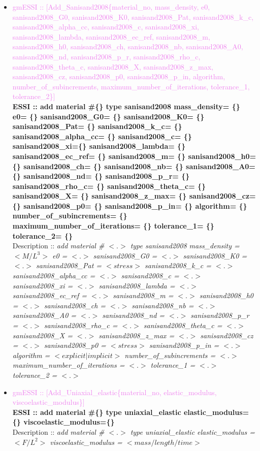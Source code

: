 \documentclass[11pt]{article}
\begin{document}
\begin{itemize}
      \item \textcolor{violet}{gmESSI :: [Add\_Sanisand2008\{material\_no, mass\_density, e0, sanisand2008\_G0, sanisand2008\_K0, sanisand2008\_Pat, sanisand2008\_k\_c, sanisand2008\_alpha\_cc, sanisand2008\_c, sanisand2008\_xi, sanisand2008\_lambda, sanisand2008\_ec\_ref, sanisand2008\_m, sanisand2008\_h0, sanisand2008\_ch, sanisand2008\_nb, sanisand2008\_A0, sanisand2008\_nd, sanisand2008\_p\_r, sanisand2008\_rho\_c, sanisand2008\_theta\_c, sanisand2008\_X, sanisand2008\_z\_max, sanisand2008\_cz, sanisand2008\_p0, sanisand2008\_p\_in, algorithm, number\_of\_subincrements, maximum\_number\_of\_iterations, tolerance\_1, tolerance\_2\}]}\\
      \textbf{ESSI :: add material \#\{\} type sanisand2008 mass\_density= \{\}  e0= \{\}  sanisand2008\_G0= \{\}  sanisand2008\_K0= \{\} sanisand2008\_Pat= \{\} sanisand2008\_k\_c= \{\}  sanisand2008\_alpha\_cc= \{\} sanisand2008\_c= \{\}  sanisand2008\_xi=\{\}  sanisand2008\_lambda= \{\}  sanisand2008\_ec\_ref= \{\}  sanisand2008\_m= \{\}  sanisand2008\_h0= \{\}  sanisand2008\_ch= \{\}  sanisand2008\_nb= \{\}  sanisand2008\_A0= \{\} sanisand2008\_nd= \{\}  sanisand2008\_p\_r= \{\}  sanisand2008\_rho\_c= \{\}  sanisand2008\_theta\_c= \{\}  sanisand2008\_X= \{\}  sanisand2008\_z\_max= \{\}  sanisand2008\_cz=\{\}  sanisand2008\_p0= \{\}  sanisand2008\_p\_in= \{\}  algorithm= \{\}  number\_of\_subincrements= \{\}  maximum\_number\_of\_iterations= \{\}  tolerance\_1= \{\}  tolerance\_2= \{\} }\\
      Description ::  \textit{ add material \# $<.>$ type sanisand2008 mass\_density = $<M/L^3>$  e0 = $<.>$  sanisand2008\_G0 = $<.>$  sanisand2008\_K0 = $<.>$ sanisand2008\_Pat = $<stress>$ sanisand2008\_k\_c = $<.>$  sanisand2008\_alpha\_cc = $<.>$ sanisand2008\_c = $<.>$  sanisand2008\_xi = $<.>$  sanisand2008\_lambda = $<.>$  sanisand2008\_ec\_ref = $<.>$  sanisand2008\_m = $<.>$  sanisand2008\_h0 = $<.>$  sanisand2008\_ch = $<.>$  sanisand2008\_nb = $<.>$  sanisand2008\_A0 = $<.>$ sanisand2008\_nd = $<.>$  sanisand2008\_p\_r = $<.>$  sanisand2008\_rho\_c = $<.>$  sanisand2008\_theta\_c = $<.>$  sanisand2008\_X = $<.>$  sanisand2008\_z\_max = $<.>$  sanisand2008\_cz = $<.>$  sanisand2008\_p0 = $<stress>$  sanisand2008\_p\_in = $<.>$  algorithm = $<explicit|implicit>$  number\_of\_subincrements = $<.>$  maximum\_number\_of\_iterations = $<.>$  tolerance\_1 = $<.>$  tolerance\_2 = $<.>$} 

      \item \textcolor{violet}{gmESSI :: [Add\_Uniaxial\_elastic\{material\_no, elastic\_modulus, viscoelastic\_modulus\}]}\\
      \textbf{ESSI :: add material \#\{\} type uniaxial\_elastic elastic\_modulus=\{\} viscoelastic\_modulus=\{\} }\\
      Description ::  \textit{ add material \# $<.>$ type uniaxial\_elastic elastic\_modulus = $<F/L^2>$ viscoelastic\_modulus = $<mass / length / time>$ } 


\end{itemize}
\end{document}
